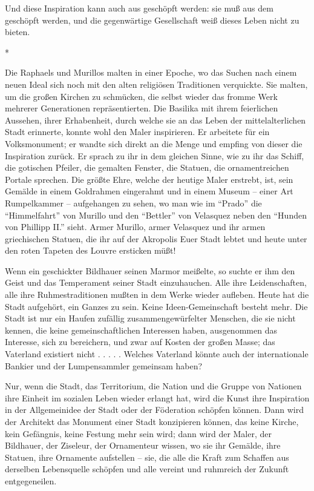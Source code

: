 \documentclass{scrbook}
\begin{document}
Und diese Inspiration kann auch  aus  geschöpft werden: sie muß aus dem  geschöpft werden, und die gegenwärtige Gesellschaft weiß dieses Leben nicht zu bieten.

\begin{center}*\end{center}

Die Raphaels und Murillos malten in einer Epoche, wo das Suchen nach einem neuen Ideal sich noch mit den alten religiösen Traditionen verquickte. Sie malten, um die großen Kirchen zu schmücken, die selbst wieder das fromme Werk mehrerer Generationen repräsentierten. Die Basilika mit ihrem feierlichen Aussehen, ihrer Erhabenheit, durch welche sie an das Leben der mittelalterlichen Stadt erinnerte, konnte wohl den Maler inspirieren. Er arbeitete für ein Volksmonument; er wandte sich direkt an die Menge und empfing von dieser die Inspiration zurück. Er sprach zu ihr in dem gleichen Sinne, wie zu ihr das Schiff, die gotischen Pfeiler, die gemalten Fenster, die Statuen, die ornamentreichen Portale sprechen. Die größte Ehre, welche der heutige Maler erstrebt, ist, sein Gemälde in einem Goldrahmen eingerahmt und in einem Museum – einer Art Rumpelkammer – aufgehangen zu sehen, wo man wie im ``Prado'' die ``Himmelfahrt'' von Murillo und den ``Bettler'' von Velasquez neben den ``Hunden von Phillipp II.'' sieht. Armer Murillo, armer Velasquez und ihr armen griechischen Statuen, die ihr auf der Akropolis Euer Stadt lebtet und heute unter den roten Tapeten des Louvre ersticken müßt!

Wenn ein geschickter Bildhauer seinen Marmor meißelte, so suchte er ihm den Geist und das Temperament seiner Stadt einzuhauchen. Alle ihre Leidenschaften, alle ihre Ruhmestraditionen mußten in dem Werke wieder aufleben. Heute hat die Stadt aufgehört, ein Ganzes zu sein. Keine Ideen-Gemeinschaft besteht mehr. Die Stadt ist nur ein Haufen zufällig zusammengewürfelter Menschen, die sie nicht kennen, die keine gemeinschaftlichen Interessen haben, ausgenommen das Interesse, sich zu bereichern, und zwar auf Kosten der großen Masse; das Vaterland existiert nicht . . . . . Welches Vaterland könnte auch der internationale Bankier und der Lumpensammler gemeinsam haben?

Nur, wenn die Stadt, das Territorium, die Nation und die Gruppe von Nationen ihre Einheit im sozialen Leben wieder erlangt hat, wird die Kunst ihre Inspiration in der Allgemeinidee der Stadt oder der Föderation schöpfen können. Dann wird der Architekt das Monument einer Stadt konzipieren können, das keine Kirche, kein Gefängnis, keine Festung mehr sein wird; dann wird der Maler, der Bildhauer, der Ziseleur, der Ornamenteur wissen, wo sie ihr Gemälde, ihre Statuen, ihre Ornamente aufstellen – sie, die alle die Kraft zum Schaffen aus derselben Lebensquelle schöpfen und alle vereint und ruhmreich der Zukunft entgegeneilen.
\end{document}
